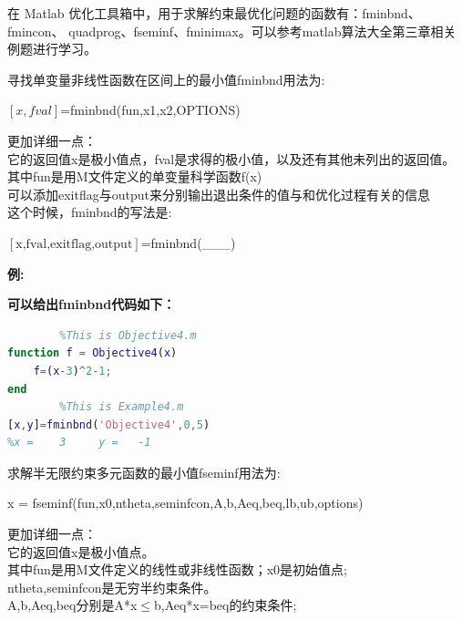 \documentclass[a4paper,20pt]{article}
\begin{document}
    \par 在 Matlab 优化工具箱中，用于求解约束最优化问题的函数有：fminbnd、fmincon、
    quadprog、fseminf、fminimax。可以参考matlab算法大全第三章相关例题进行学习。
    \par \noindent 寻找单变量非线性函数在区间上的最小值fminbnd用法为:
    \begin{center}
        $\left[x,fval \right]$={fminbnd}({fun},{x1},{x2},{OPTIONS})
    \end{center}
    \par \noindent 更加详细一点：
    \\它的返回值x是极小值点，fval是求得的极小值，以及还有其他未列出的返回值。
    \\其中fun是用M文件定义的单变量科学函数f(x)
    \\可以添加exitflag与output来分别输出退出条件的值与和优化过程有关的信息
    \\这个时候，fminbnd的写法是:
    \begin{center}
        $\left[ \text{x,fval,exitflag,output}\right]$=fminbnd(\_\_\_)
    \end{center}
    \par \textbf{例:}
    \par \noindent {}
    \par \noindent \textbf{可以给出fminbnd代码如下：}
    \begin{center}
        \begin{lstlisting}[caption={Fminbnd},language=Matlab]
% NonLinear Programming
        %This is Objective4.m
function f = Objective4(x) 
    f=(x-3)^2-1;
end
        %This is Example4.m
[x,y]=fminbnd('Objective4',0,5) 
%x =    3     y =   -1
            \end{lstlisting}
    \end{center}
    \par \noindent 求解半无限约束多元函数的最小值fseminf用法为:
    \begin{center}
        x = fseminf(fun,x0,ntheta,seminfcon,A,b,Aeq,beq,lb,ub,options)
    \end{center}
    \par \noindent 更加详细一点：
    \\它的返回值x是极小值点。
    \\其中fun是用M文件定义的线性或非线性函数；x0是初始值点;
    \\ntheta,seminfcon是无穷半约束条件。
    \\A,b,Aeq,beq分别是A*x$\leq$b,Aeq*x=beq的约束条件;
\end{document}
